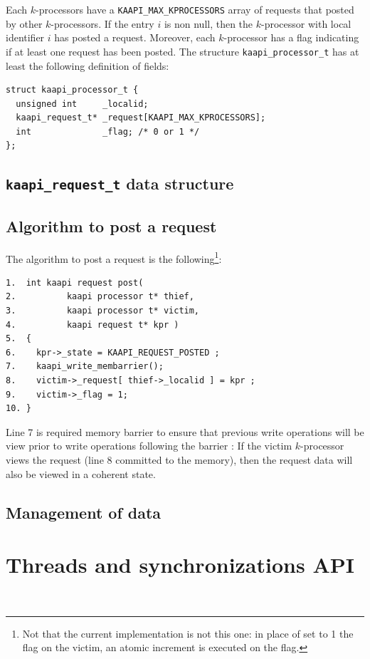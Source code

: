 \documentclass{report}
\begin{document}
Each $k$-processors have a \verb+KAAPI_MAX_KPROCESSORS+ array of requests that posted by other $k$-processors.
If the entry $i$ is non null, then the $k$-processor with local identifier $i$ has posted a request. Moreover, each $k$-processor has a flag indicating if at least one request has been posted. The structure \texttt{kaapi\_processor\_t} has at least the following definition of fields:
\begin{verbatim}
struct kaapi_processor_t {
  unsigned int     _localid;
  kaapi_request_t* _request[KAAPI_MAX_KPROCESSORS]; 
  int              _flag; /* 0 or 1 */
};
\end{verbatim}

\subsection{\texttt{kaapi\_request\_t} data structure}


\subsection{Algorithm to post a request}
The algorithm to post a request is the following\footnote{Not that the current implementation is not this one: in place of set to 1 the flag on the victim, an atomic increment is executed on the flag.}:
\begin{verbatim}
1.  int kaapi request post( 
2.          kaapi processor t* thief, 
3.          kaapi processor t* victim, 
4.          kaapi request t* kpr )
5.  {
6.    kpr->_state = KAAPI_REQUEST_POSTED ;
7.    kaapi_write_membarrier();
8.    victim->_request[ thief->_localid ] = kpr ;
9.    victim->_flag = 1;
10. }
\end{verbatim}
Line 7 is required memory barrier to ensure that previous write operations will be view prior to write operations following the barrier : If the victim $k$-processor views the request (line 8 committed to the memory), then the request data will also be viewed in a coherent state.

\subsection{Management of data}


\section{Threads and synchronizations API}
\\
\end{document}
